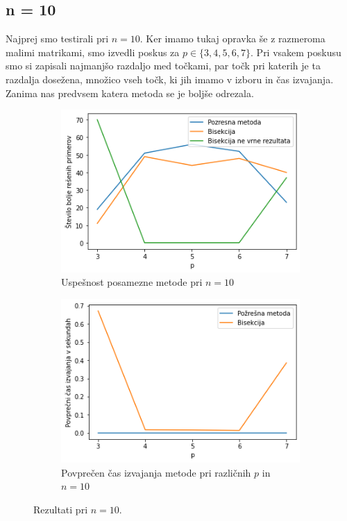 \documentclass[a4paper]{article}
\begin{document}
\subsection{n = 10}
Najprej smo testirali pri $n = 10$. Ker imamo tukaj opravka še z razmeroma malimi matrikami, smo izvedli poskus za $p \in \{3, 4, 5, 6, 7\}$. Pri vsakem poskusu smo si zapisali najmanjšo razdaljo med točkami, par točk pri katerih je ta razdalja dosežena, množico vseh točk, ki jih imamo v izboru in čas izvajanja. Zanima nas predvsem katera metoda se je boljše odrezala. 

\begin{figure}[ht]
	\begin{subfigure}[t]{0.45\textwidth}
		\centering
		\includegraphics[width=\textwidth]{n_10.png}
		\caption{Uspešnost posamezne metode pri $n = 10$}
		\label{n_10_count}
	\end{subfigure}
	\hfill
	\begin{subfigure}[t]{0.45\textwidth}
		\centering
		\includegraphics[width=\textwidth]{n_10_time.png}
		\caption{Povprečen čas izvajanja metode pri različnih $p$ in $n = 10$}
		\label{n_10_time}
	\end{subfigure}
    \caption{Rezultati pri $n = 10$.}
    \label{fig:n_10}
\end{figure}
\end{document}
